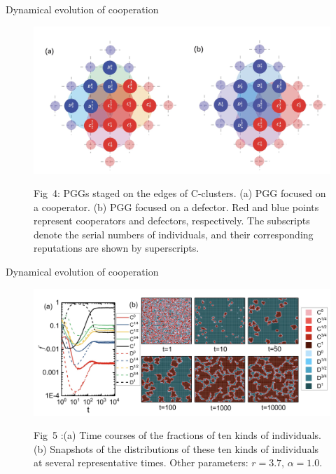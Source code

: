 \documentclass[notheorems,11pt,compress]{beamer}
\numberwithin{figure}{section}
\numberwithin{table}{section}
\numberwithin{equation}{section}
\theoremstyle{plain}
\numberwithin{theorem}{section}
\numberwithin{definition}{section}
\numberwithin{lemma}{section}
\numberwithin{proposition}{section}
\numberwithin{corollary}{section}
\theoremstyle{example}
\begin{document}
\begin{frame}{Dynamical evolution of cooperation
	}


	\begin{figure}[H]
		\centering
		\includegraphics[width=1\linewidth]{4}
		\label{fig4}
		\parbox{.8\textwidth}{\scriptsize Fig\ 4: PGGs staged on the edges of C-clusters. (a) PGG focused on a cooperator. (b) PGG focused on a defector. Red and blue points represent cooperators and defectors, respectively. The subscripts denote the serial numbers of individuals, and their corresponding reputations are shown by superscripts.
		}
	\end{figure}
\end{frame}


\begin{frame}{Dynamical evolution of cooperation
	}
	\begin{figure}[H]
		\centering
		\includegraphics[width=1.05\linewidth]{5}
		\label{fig5}
		\parbox{.8\textwidth}{\scriptsize Fig\ 5 :(a) Time courses of the fractions of ten kinds of individuals. (b) Snapshots of the distributions of these ten kinds of individuals at several representative times. Other parameters: $r = 3.7$, $\alpha = 1.0$.
		}
	\end{figure}
\end{frame}
\end{document}
